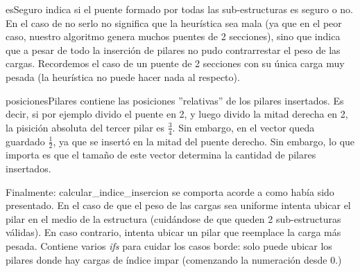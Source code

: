 esSeguro indica si el puente formado por todas las sub-estructuras es seguro o no. En el caso de no serlo no significa
que la heurística sea mala (ya que en el peor caso, nuestro algoritmo genera muchos puentes de 2 secciones), sino
que indica que a pesar de todo la inserción de pilares no pudo contrarrestar el peso de las cargas. Recordemos
el caso de un puente de 2 secciones con su única carga muy pesada (la heurística no puede hacer nada al respecto).

posicionesPilares contiene las posiciones ''relativas'' de los pilares insertados. Es decir, si por ejemplo divido el puente
en 2, y luego divido la mitad derecha en 2, la pisición absoluta del tercer pilar es $\frac{3}{4}$. Sin embargo, en el 
vector queda guardado $\frac{1}{2}$, ya que se insertó en la mitad del puente derecho. Sin embargo, lo que importa es que
el tamaño de este vector determina la cantidad de pilares insertados.

Finalmente: calcular\_indice\_insercion se comporta acorde a como había sido presentado. En el caso de que el peso de las
cargas sea uniforme intenta ubicar el pilar en el medio de la estructura (cuidándose de que queden 2 sub-estructuras
válidas). En caso contrario, intenta ubicar un pilar que reemplace la carga más pesada. Contiene varios \emph{ifs} para
cuidar los casos borde: solo puede ubicar los pilares donde hay cargas de índice impar (comenzando la numeración
desde 0.)